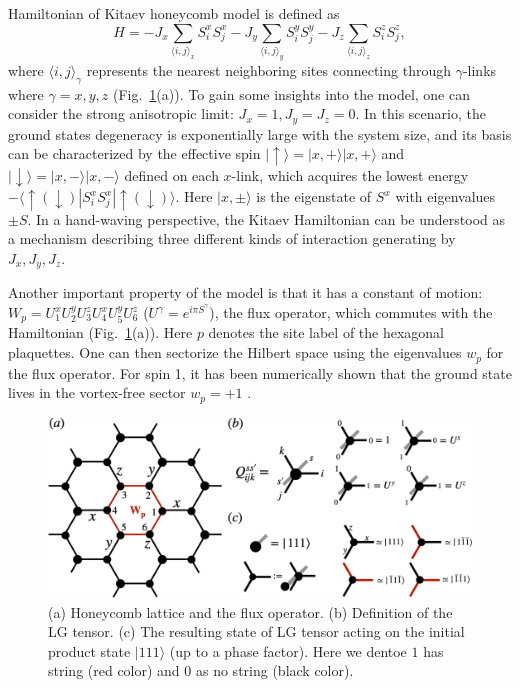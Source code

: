 \documentclass{ntuthesis}
\newcommand{\citep}{\cite}
\begin{document}
Hamiltonian of Kitaev honeycomb model is defined as 
\begin{equation}
H = -J_x \sum_{ \langle i,j  \rangle_x } S_i^xS_j^x - J_y \sum_{\langle i,j \rangle_y} S_i^yS_j^y  - J_z\sum_{\langle i,j \rangle_z} S_i^zS_j^z,
\end{equation}
where $\langle i,j \rangle_\gamma$ represents the nearest neighboring sites connecting through $\gamma$-links where $\gamma = x,y,z$ (Fig.~\ref{fig:honeycomb_LG}(a)). To gain some insights into the model, one can consider the strong anisotropic limit: $J_x = 1, J_y = J_z = 0$. In this scenario, the ground states degeneracy is exponentially large with the system size, and its basis can be characterized by the effective spin $|\uparrow \rangle =  |x,+\rangle |x, + \rangle$ and $|\downarrow \rangle = |x,-\rangle |x, -\rangle$ defined on each $x$-link, which acquires the lowest energy  $-\langle \uparrow ( \downarrow)| S_i^xS_j^x| \uparrow  (\downarrow) \rangle$. Here $|x,\pm \rangle$ is the eigenstate of $S^x$ with eigenvalues $\pm S$. In a hand-waving perspective, the Kitaev Hamiltonian can be understood as a mechanism describing three different kinds of interaction generating by $J_x,J_y,J_z$.

Another important property of the model is that it has a constant of motion: $W_p = U_1^xU_2^yU_3^z U_4^xU_5^yU_6^z$ ($U^\gamma = e^{i\pi S^\gamma}$), the flux operator, which commutes with the Hamiltonian (Fig.~\ref{fig:honeycomb_LG}(a)). Here $p$ denotes the site label of the hexagonal plaquettes. One can then sectorize the Hilbert space using the eigenvalues $w_p$ for the flux operator. For spin 1, it has been numerically shown that the ground state lives in the vortex-free sector $w_p = +1$ \citep{spin_one_half, lee2020anisotropy}.

\begin{figure}[h]
\centering
\includegraphics[width=\linewidth]{honeycomb_LG}
\caption{(a) Honeycomb lattice and the flux operator. (b) Definition of the LG tensor. (c) The resulting state of LG tensor acting on the initial product state $|111\rangle$ (up to a phase factor). Here we dentoe $1$ has string (red color) and $0$ as no string (black color).} 
\label{fig:honeycomb_LG}
\end{figure}
\end{document}
